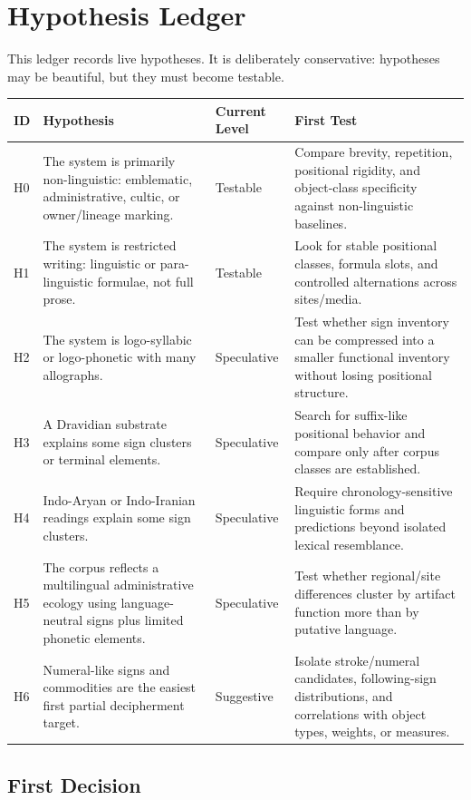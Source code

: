 \section{Hypothesis Ledger}

This ledger records live hypotheses. It is deliberately conservative: hypotheses may be beautiful, but they must become testable.

\begin{longtable}{p{}p{}p{}p{}}
\toprule
\textbf{ID} & \textbf{Hypothesis} & \textbf{Current Level} & \textbf{First Test} \\
\midrule
\endhead
H0 & The system is primarily non-linguistic: emblematic, administrative, cultic, or owner/lineage marking. & Testable & Compare brevity, repetition, positional rigidity, and object-class specificity against non-linguistic baselines. \\
H1 & The system is restricted writing: linguistic or para-linguistic formulae, not full prose. & Testable & Look for stable positional classes, formula slots, and controlled alternations across sites/media. \\
H2 & The system is logo-syllabic or logo-phonetic with many allographs. & Speculative & Test whether sign inventory can be compressed into a smaller functional inventory without losing positional structure. \\
H3 & A Dravidian substrate explains some sign clusters or terminal elements. & Speculative & Search for suffix-like positional behavior and compare only after corpus classes are established. \\
H4 & Indo-Aryan or Indo-Iranian readings explain some sign clusters. & Speculative & Require chronology-sensitive linguistic forms and predictions beyond isolated lexical resemblance. \\
H5 & The corpus reflects a multilingual administrative ecology using language-neutral signs plus limited phonetic elements. & Speculative & Test whether regional/site differences cluster by artifact function more than by putative language. \\
H6 & Numeral-like signs and commodities are the easiest first partial decipherment target. & Suggestive & Isolate stroke/numeral candidates, following-sign distributions, and correlations with object types, weights, or measures. \\
\bottomrule
\end{longtable}

\subsection{First Decision}

